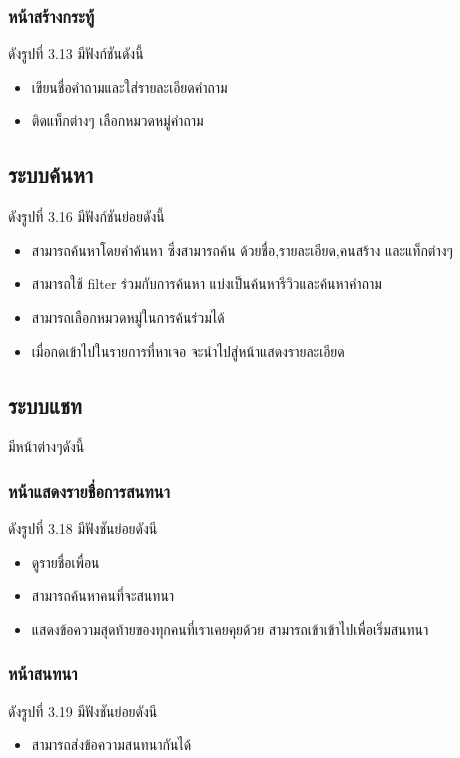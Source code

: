 \subsubsection{หน้าสร้างกระทู้ }
ดังรูปที่ 3.13 มีฟังก์ชันดังนี้
\begin{itemize}
  \item เขียนชื่อคำถามและใส่รายละเอียดคำถาม
  \item ติดแท็กต่างๆ เลือกหมวดหมู่คำถาม
 \end{itemize}


 \subsection{ระบบค้นหา }
ดังรูปที่ 3.16 มีฟังก์ชันย่อยดังนี้
\begin{itemize}
  \item สามารถค้นหาโดยคำค้นหา ซึ่งสามารถค้น ด้วยชื่อ,รายละเอียด,คนสร้าง และแท็กต่างๆ
  \item สามารถใช้ filter ร่วมกับการค้นหา แบ่งเป็นค้นหารีวิวและค้นหาคำถาม 
  \item สามารถเลือกหมวดหมู่ในการค้นร่วมได้
  \item เมื่อกดเข้าไปในรายการที่หาเจอ จะนำไปสู่หน้าแสดงรายละเอียด
 \end{itemize}


 \subsection{ระบบแชท }
 มีหน้าต่างๆดังนี้
 
 \subsubsection{หน้าแสดงรายชื่อการสนทนา }
 ดังรูปที่ 3.18 มีฟังชันย่อยดังนี
\begin{itemize}
  \item ดูรายชื่อเพื่อน
  \item สามารถค้นหาคนที่จะสนทนา
  \item แสดงข้อความสุดท้ายของทุกคนที่เราเคยคุยด้วย สามารถเข้าเข้าไปเพื่อเริ่มสนทนา
 \end{itemize}
 
 \subsubsection{หน้าสนทนา }
 ดังรูปที่ 3.19 มีฟังชันย่อยดังนี
\begin{itemize}
  \item สามารถส่งข้อความสนทนากันได้
 \end{itemize}

